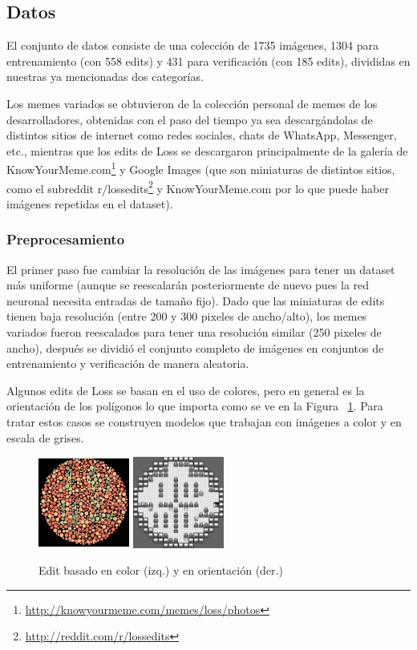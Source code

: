 \documentclass[spanish,11pt,letterpaper]{article}
\begin{document}
\subsection{Datos}

El conjunto de datos consiste de una colección de 1735 imágenes, 1304 para
entrenamiento (con 558 edits) y 431 para verificación (con 185 edits), divididas
en nuestras ya mencionadas dos categorías.

Los memes variados se obtuvieron de la colección personal de memes de los
desarrolladores, obtenidas con el paso del tiempo ya sea descargándolas de
distintos sitios de internet como redes sociales, chats de WhatsApp, Messenger,
etc., mientras que los edits de Loss se descargaron principalmente de la galería
de \textsf{KnowYourMeme.com}\footnote{\url{http://knowyourmeme.com/memes/loss/photos}} y
\textsf{Google Images} (que son miniaturas de distintos sitios, como el subreddit
\textsf{r/lossedits}\footnote{\url{http://reddit.com/r/lossedits}} y
\textsf{KnowYourMeme.com} por lo que puede haber imágenes repetidas en el dataset).

\subsubsection{Preprocesamiento}

El primer paso fue cambiar la resolución de las imágenes para tener un dataset
más uniforme (aunque se reescalarán posteriormente de nuevo pues la red neuronal
necesita entradas de tamaño fijo). Dado que las miniaturas de edits tienen baja
resolución (entre 200 y 300 pixeles de ancho/alto), los memes variados fueron
reescalados para tener una resolución similar (250 pixeles de ancho), después se
dividió el conjunto completo de imágenes en conjuntos de entrenamiento y
verificación de manera aleatoria.

Algunos edits de Loss se basan en el uso de colores, pero en general es la
orientación de los polígonos lo que importa como se ve en la Figura ~\ref{fig:color}.
Para tratar estos casos se construyen modelos que trabajan con imágenes a color
y en escala de grises.

\begin{figure}[h]
\centering
\includegraphics[height=3cm,width=3cm]{loss_color}
\includegraphics[height=3cm,width=3cm]{pokemon}
\caption{Edit basado en color (izq.) y en orientación (der.)}
\label{fig:color}
\end{figure}
\end{document}
